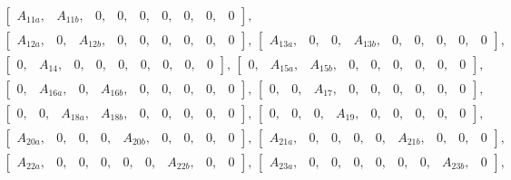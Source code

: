 \begin{multline}
 \begin{bmatrix} A_{11a}, & A_{11b}, & 0, & 0, & 0, & 0, & 0, & 0, & 0  \end{bmatrix},\, \\ %
 \begin{bmatrix} A_{12a}, & 0, & A_{12b}, & 0, & 0, & 0, & 0, & 0, & 0  \end{bmatrix},\, %
 \begin{bmatrix} A_{13a}, & 0, & 0, & A_{13b}, & 0, & 0, & 0, & 0, & 0  \end{bmatrix},\, \\ %
 \begin{bmatrix} 0, & A_{14}, & 0, & 0, & 0, & 0, & 0, & 0, & 0  \end{bmatrix},\, %
 \begin{bmatrix} 0, &  A_{15a}, & A_{15b}, & 0, & 0, & 0, & 0, & 0, & 0  \end{bmatrix},\, \\%
 \begin{bmatrix} 0, &  A_{16a}, & 0, & A_{16b}, & 0, & 0, & 0, & 0, & 0  \end{bmatrix},\,  %
 \begin{bmatrix} 0, & 0, & A_{17}, & 0, & 0, & 0, & 0, & 0, & 0  \end{bmatrix},\, \\ %
\begin{bmatrix} 0, & 0, &  A_{18a}, & A_{18b}, & 0, & 0, & 0, & 0, & 0  \end{bmatrix},\,  %
 \begin{bmatrix} 0, & 0, & 0, & A_{19}, & 0, & 0, & 0, & 0, & 0  \end{bmatrix},\, \\ %
 \begin{bmatrix} A_{20a}, & 0, & 0, & 0, & A_{20b}, & 0, & 0, & 0, & 0  \end{bmatrix},\, %
 \begin{bmatrix} A_{21a}, & 0, & 0, & 0, & 0, & A_{21b}, & 0, & 0, & 0  \end{bmatrix},\, \\ %
 \begin{bmatrix} A_{22a}, & 0, & 0, & 0, & 0, & 0, & A_{22b}, & 0, & 0  \end{bmatrix},\, %
 \begin{bmatrix} A_{23a}, & 0, & 0, & 0, & 0, & 0, & 0, & A_{23b}, & 0  \end{bmatrix},\, \\ %

\end{multline}
